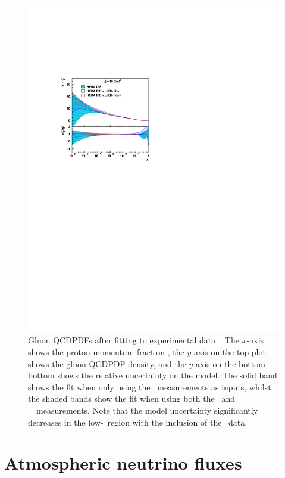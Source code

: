 \begin{figure}
  \centering
  \includegraphics[width=\textwidth]{figures/production/prosa_gluon_pdf_fit}
  \caption{%
    Gluon \acp{QCDPDF} after fitting to experimental 
    data~\cite{Zenaiev:2015rfa}.
    The $x$-axis shows the proton momentum fraction \bjorkenx, the $y$-axis on 
    the top plot shows the gluon \ac{QCDPDF} density, and the $y$-axis on the 
    bottom bottom shows the relative uncertainty on the model.
    The solid band shows the fit when only using the \hera\ measurements as 
    inputs, whilst the shaded bands show the fit when using both the \hera\ and 
    \ \lhcb\ measurements.
    Note that the model uncertainty significantly decreases in the 
    low-\bjorkenx\ region with the inclusion of the \lhcb\ data.
  }
  \label{fig:prod:theory:prosa_gluon_pdf_fit}
\end{figure}

\section{Atmospheric neutrino fluxes}
\label{chap:prod:theory:neutrinos}


